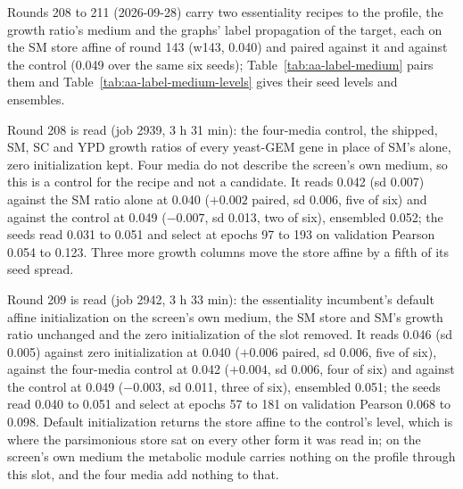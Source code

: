 Rounds 208 to 211 (2026-09-28) carry two essentiality recipes to the profile, the
growth ratio's medium and the graphs' label propagation of the target, each on the SM
store affine of round 143 (w143, 0.040) and paired against it and against the control
(0.049 over the same six seeds); Table~\ref{tab:aa-label-medium} pairs them and
Table~\ref{tab:aa-label-medium-levels} gives their seed levels and ensembles.

Round 208 is read (job 2939, 3 h 31 min): the four-media control, the shipped, SM, SC
and YPD growth ratios of every yeast-GEM gene in place of SM's alone, zero
initialization kept. Four media do not describe the screen's own medium, so this is a
control for the recipe and not a candidate. It reads 0.042 (sd 0.007) against the SM
ratio alone at 0.040 ($+0.002$ paired, sd 0.006, five of six) and against the control
at 0.049 ($-0.007$, sd 0.013, two of six), ensembled 0.052; the seeds read 0.031 to
0.051 and select at epochs 97 to 193 on validation Pearson 0.054 to 0.123. Three more
growth columns move the store affine by a fifth of its seed spread.

Round 209 is read (job 2942, 3 h 33 min): the essentiality incumbent's default affine
initialization on the screen's own medium, the SM store and SM's growth ratio unchanged
and the zero initialization of the slot removed. It reads 0.046 (sd 0.005) against
zero initialization at 0.040 ($+0.006$ paired, sd 0.006, five of six), against the
four-media control at 0.042 ($+0.004$, sd 0.006, four of six) and against the control
at 0.049 ($-0.003$, sd 0.011, three of six), ensembled 0.051; the seeds read 0.040 to
0.051 and select at epochs 57 to 181 on validation Pearson 0.068 to 0.098. Default
initialization returns the store affine to the control's level, which is where the
parsimonious store sat on every other form it was read in; on the screen's own medium
the metabolic module carries nothing on the profile through this slot, and the four
media add nothing to that.

